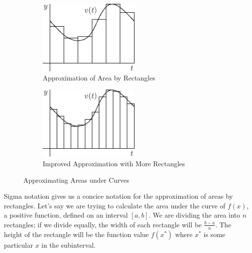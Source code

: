 \documentclass[fleqn]{report}
\begin{document}
\begin{figure}[t]
\centering
\begin{subfigure}{.5\textwidth}
 \centering
 \includegraphics[width=5cm]{figure16.eps}
 \caption{Approximation of Area by Rectangles}
\end{subfigure}%
\begin{subfigure}{.5\textwidth}
 \centering
 \includegraphics[width=5cm]{figure17.eps}
 \caption{Improved Approximation with More Rectangles}
\end{subfigure}
\caption{Approximating Areas under Curves}
\label{Approximating Areas under Curves 2}
\end{figure}

Sigma notation gives us a concice notation for the
approximation of areas by rectangles. Let's say we are trying
to calculate the area under the curve of $f(x)$, a positive
function, defined on an interval $[a,b]$. We are
dividing the area into $n$ rectangles; if we divide equally,
the width of each rectangle will be $\frac{b-a}{n}$. The
height of the rectangle will be the function value $f(x^*)$
where $x^*$ is some particular $x$ in the subinterval.
\end{document}
